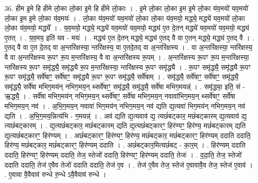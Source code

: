 \documentclass[17pt]{extarticle}
\begin{document}
36. हीम इ॒मे हि हीमे लो॒का लो॒का इ॒मे हि हीमे लो॒काः । . इ॒मे लो॒का लो॒का इ॒म इ॒मे लो॒का य॑व॒मयो॑ यव॒मयो॑ लो॒का इ॒म इ॒मे लो॒का य॑व॒मयः॑ । . लो॒का य॑व॒मयो॑ यव॒मयो॑ लो॒का लो॒का य॑व॒मयो॒ मद्ध्ये॒ मद्ध्ये॑ यव॒मयो॑ लो॒का लो॒का य॑व॒मयो॒ मद्ध्ये᳚ । . य॒व॒मयो॒ मद्ध्ये॒ मद्ध्ये॑ यव॒मयो॑ यव॒मयो॒ मद्ध्य॑ ए॒त दे॒तन् मद्ध्ये॑ यव॒मयो॑ यव॒मयो॒ मद्ध्य॑ ए॒तत् । . य॒व॒मय॒ इति॑ यव - मयः॑ । . मद्ध्य॑ ए॒त दे॒तन् मद्ध्ये॒ मद्ध्य॑ ए॒तद् वै वा ए॒तन् मद्ध्ये॒ मद्ध्य॑ ए॒तद् वै । . ए॒तद् वै वा ए॒त दे॒तद् वा अ॒न्तरि॑क्षस्या॒ न्तरि॑क्षस्य॒ वा ए॒तदे॒तद् वा अ॒न्तरि॑क्षस्य । . वा अ॒न्तरि॑क्षस्या॒ न्तरि॑क्षस्य॒ वै वा अ॒न्तरि॑क्षस्य रू॒पꣳ रू॒प म॒न्तरि॑क्षस्य॒ वै वा अ॒न्तरि॑क्षस्य रू॒पम् । . अ॒न्तरि॑क्षस्य रू॒पꣳ रू॒प म॒न्तरि॑क्षस्या॒ न्तरि॑क्षस्य रू॒पꣳ समृ॑द्ध्यै॒ समृ॑द्ध्यै रू॒प म॒न्तरि॑क्षस्या॒ न्तरि॑क्षस्य रू॒पꣳ समृ॑द्ध्यै । . रू॒पꣳ समृ॑द्ध्यै॒ समृ॑द्ध्यै रू॒पꣳ रू॒पꣳ समृ॑द्ध्यै॒ सर्वे॑षाꣳ॒॒ सर्वे॑षाꣳ॒॒ समृ॑द्ध्यै रू॒पꣳ रू॒पꣳ समृ॑द्ध्यै॒ सर्वे॑षाम् । . समृ॑द्ध्यै॒ सर्वे॑षाꣳ॒॒ सर्वे॑षाꣳ॒॒ समृ॑द्ध्यै॒ समृ॑द्ध्यै॒ सर्वे॑षा मभिग॒मय॑न् नभिग॒मय॒न् थ्सर्वे॑षाꣳ॒॒ समृ॑द्ध्यै॒ समृ॑द्ध्यै॒ सर्वे॑षा मभिग॒मयन्न्॑ । . समृ॑द्ध्या॒ इति॒ सं - ऋ॒द्ध्यै॒ । . सर्वे॑षा मभिग॒मय॑न् नभिग॒मय॒न् थ्सर्वे॑षाꣳ॒॒ सर्वे॑षा मभिग॒मय॒न् नवावा॑भिग॒मय॒न् थ्सर्वे॑षाꣳ॒॒ सर्वे॑षा मभिग॒मय॒न् नव॑ । . अ॒भि॒ग॒मय॒न् नवावा॑ भिग॒मय॑न् नभिग॒मय॒न् नव॑ द्यति द्य॒त्यवा॑ भिग॒मय॑न् नभिग॒मय॒न् नव॑ द्यति । . अ॒भि॒ग॒मय॒न्नित्य॑भि - ग॒मयन्न्॑ । . अव॑ द्यति द्य॒त्यवाव॑ द्य॒ त्यछं॑बट्कार॒ मछं॑बट्कारम् द्य॒त्यवाव॑ द्य॒ त्यछं॑बट्कारम् । . द्य॒त्यछं॑बट्कार॒ मछं॑बट्कारम् द्यति द्य॒त्यछं॑बट्कारꣳ॒॒ हिर॑ण्यꣳ॒॒ हिर॑ण्य॒ मछं॑बट्कारम् द्यति द्य॒त्यछं॑बट्कारꣳ॒॒ हिर॑ण्यम् । . अछं॑बट्कारꣳ॒॒ हिर॑ण्यꣳ॒॒ हिर॑ण्य॒ मछं॑बट्कार॒ मछं॑बट्कारꣳ॒॒ हिर॑ण्यम् ददाति ददाति॒ हिर॑ण्य॒ मछं॑बट्कार॒ मछं॑बट्कारꣳ॒॒ हिर॑ण्यम् ददाति । . अछं॑बट्कार॒मित्यछं॑बट् - का॒र॒म् । . हिर॑ण्यम् ददाति ददाति॒ हिर॑ण्यꣳ॒॒ हिर॑ण्यम् ददाति॒ तेज॒ स्तेजो॑ ददाति॒ हिर॑ण्यꣳ॒॒ हिर॑ण्यम् ददाति॒ तेजः॑ । . द॒दा॒ति॒ तेज॒ स्तेजो॑ ददाति ददाति॒ तेज॑ ए॒वैव तेजो॑ ददाति ददाति॒ तेज॑ ए॒व । . तेज॑ ए॒वैव तेज॒ स्तेज॑ ए॒वावावै॒व तेज॒ स्तेज॑ ए॒वाव॑ । . ए॒वावा वै॒वैवाव॑ रुन्धे रु॒न्धे ऽवै॒वैवाव॑ रुन्धे । \newline
\pagebreak
{}
\end{document}
